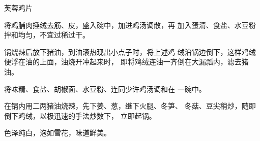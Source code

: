 \begin{recipe}{芙蓉鸡片}

\ingredients


\cooking

将鸡脯肉捶绒去筋、皮，盛入碗中，加进鸡汤调散，再 加入蛋清、食盐、水豆粉拌和均匀，不宜过稀过干。

锅烧辣后放下猪油，到油滚热现出小点子时，将上述鸡 绒沿锅边倒下，这样鸡绒便浮在油的上面，油烧开冲起来时， 即将鸡绒连油一齐倒在大漏瓢内，滤去猪油。

将味精、食盐、胡椒面、水豆粉、连同少许鸡汤调和在 一碗中。

在锅内用二两猪油烧辣，先下姜、葱，继下火腿、冬笋、 冬菇、豆尖稍炒，随即倒下鸡绒，以极迅速的手法炒数下， 立即起锅。

\notes

色泽纯白，泡如雪花，味道鲜美。

\end{recipe}

